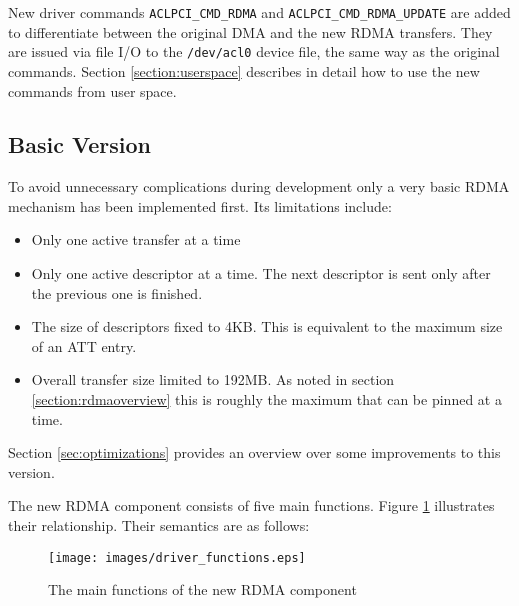 %
New driver commands \texttt{ACLPCI\_CMD\_RDMA} and \texttt{ACLPCI\_CMD\_RDMA\_UPDATE} are added to differentiate between the original DMA and the new RDMA transfers.
They are issued via file I/O to the \texttt{/dev/acl0} device file, the same way as the original commands.
Section \ref{section:userspace} describes in detail how to use the new commands from user space.



\subsection{Basic Version}




To avoid unnecessary complications during development only a very basic RDMA mechanism has been implemented first.
Its limitations include:
\begin{itemize}
	
\item Only one active transfer at a time
\item Only one active descriptor at a time. The next descriptor is sent only after the previous one is finished.
\item The size of descriptors fixed to 4KB. This is equivalent to the maximum size of an ATT entry.
\item Overall transfer size limited to 192MB. As noted in section \ref{section:rdmaoverview} this is roughly the maximum that can be pinned at a time.
\end{itemize}
Section \ref{sec:optimizations} provides an overview over some improvements to this version.

The new RDMA component consists of five main functions. Figure \ref{fig:driver_functions} illustrates their relationship. Their semantics are as follows:


\begin{figure}[htb]
	  \centerline{
		\texttt{[image: images/driver\_functions.eps]}}
	  \caption{The main functions of the new RDMA component}
	  \label{fig:driver_functions}
\end{figure}




